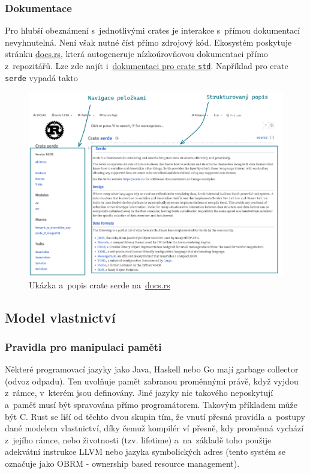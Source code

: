 \documentclass[a4paper, 12pt, twoside]{article} %
\newcommand{\rust}[1]{\texttt{#1}}
\begin{document}
		\subsubsection*{Dokumentace}
			Pro hlubší obeznámení s~jednotlivými crates je interakce s~přímou dokumentací nevyhnutelná. Není však nutné číst přímo zdrojový kód. Ekosystém poskytuje stránku \href{https://docs.rs}{docs.rs}, která autogeneruje nízkoúrovňovou dokumentaci přímo z~repozitářů. Lze zde najít i~\href{https://docs.rs/rustc-std-workspace-std/latest/std/index.html}{dokumentaci pro crate \rust{std}}. Například pro crate \rust{serde} vypadá takto
			\begin{center}
				\begin{figure}[H]
					\centering
					\includegraphics[width=\linewidth]{docsrs}
					\caption{Ukázka a~popis crate serde na~\href{https://docs.rs}{docs.rs}}
					\label{fig:docsrs}
				\end{figure}
			\end{center}

	\subsection{Model vlastnictví}
		\subsubsection*{Pravidla pro manipulaci paměti}
			Některé programovací jazyky jako Java, Haskell nebo Go mají garbage collector (odvoz odpadu). Ten uvolňuje pamět zabranou proměnnými právě, když vyjdou z~rámce, v~kterém jsou definovány. Jiné jazyky nic takového neposkytují a~paměť musí být spravována přímo programátorem. Takovým příkladem může být C. Rust se liší od těchto dvou skupin tím, že vnutí přesná pravidla a~postupy dané modelem vlastnictví, díky čemuž kompilér ví přesně, kdy proměnná vychází z~jejího rámce, nebo životnosti (tzv. lifetime) a~na~základě toho použije adekvátní instrukce LLVM nebo jazyka symbolických adres (tento systém se označuje jako OBRM - ownership based resource management).
		
\end{document}
